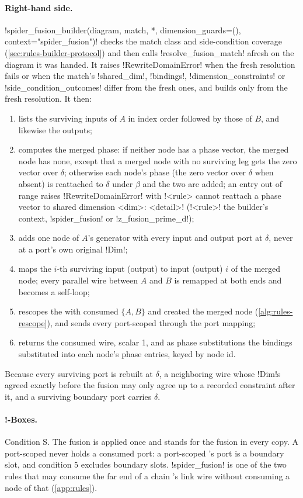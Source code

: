 \paragraph{Right-hand side.} \py!spider_fusion_builder(diagram, match, *, dimension_guards=(), context="spider_fusion")! checks the match class and side-condition coverage (\cref{sec:rules-builder-protocol}) and then calls \py!resolve_fusion_match! afresh on the diagram it was handed. It raises \py!RewriteDomainError! when the fresh resolution fails or when the match's \py!shared_dim!, \py!bindings!, \py!dimension_constraints! or \py!side_condition_outcomes! differ from the fresh ones, and builds only from the fresh resolution. It then:
\begin{enumerate}
\item lists the surviving inputs of $A$ in index order followed by those of $B$, and likewise the outputs;
\item computes the merged phase: if neither node has a phase vector, the merged node has none, except that a merged node with no surviving leg gets the zero vector over $\delta$; otherwise each node's phase (the zero vector over $\delta$ when absent) is reattached to $\delta$ under $\beta$ and the two are added; an entry out of range raises \py!RewriteDomainError! with \code!<rule> cannot reattach a phase vector to shared dimension <dim>: <detail>! (\code!<rule>! the builder's context, \code!spider_fusion! or \code!z_fusion_prime_d!);
\item adds one node of $A$'s generator with every input and output port at $\delta$, never at a port's own original \py!Dim!;
\item maps the $i$-th surviving input (output) to input (output) $i$ of the merged node; every parallel wire between $A$ and $B$ is remapped at both ends and becomes a self-loop;
\item rescopes the \bboxes{} with consumed $\{A,B\}$ and created the merged node (\cref{alg:rules-rescope}), and sends every port-scoped \bbox{} through the port mapping;
\item returns the consumed wire, scalar 1, and as phase substitutions the bindings substituted into each node's phase entries, keyed by node id.
\end{enumerate}
Because every surviving port is rebuilt at $\delta$, a neighboring wire whose \py!Dim!s agreed exactly before the fusion may only agree up to a recorded constraint after it, and a surviving boundary port carries $\delta$.

\paragraph{!-Boxes.} Condition S. The fusion is applied once and stands for the fusion in every copy. A port-scoped \bbox{} never holds a consumed port: a port-scoped \bbox{}'s port is a boundary slot, and condition 5 excludes boundary slots. \azx!spider_fusion! is one of the two rules that may consume the far end of a chain \bbox{}'s link wire without consuming a node of that \bbox{} (\cref{app:rules}).


